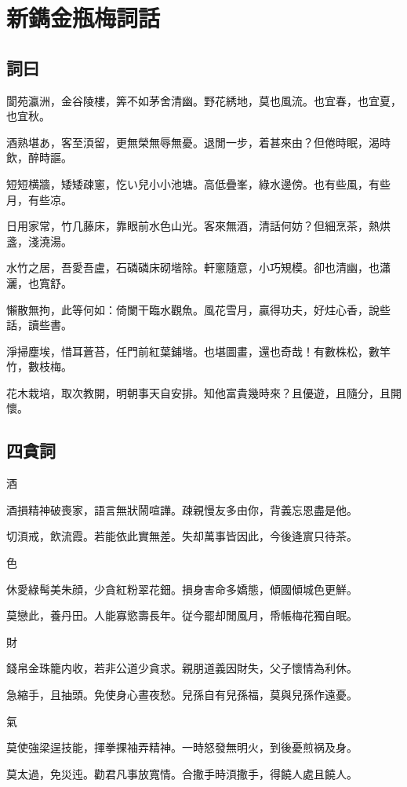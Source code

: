 \chapter*{新鐫金瓶梅詞話}


\section*{詞曰}

\begin{myquote0}
閬苑瀛洲，金谷陵樓，筭不如茅舍清幽。野花綉地，莫也風流。也宜春，也宜夏，也宜秋。

酒熟堪あ，客至湏留，更無榮無辱無憂。退閒一步，着甚來由？但倦時眠，渴時飲，醉時謳。

短短横牆，矮矮疎窻，忔い兒小小池塘。高低疊峯，綠水邊傍。也有些風，有些月，有些凉。

日用家常，竹几藤床，靠眼前水色山光。客來無酒，清話何妨？但細烹茶，熱烘盞，淺澆湯。

水竹之居，吾愛吾盧，石磷磷床砌堦除。軒窻隨意，小巧䂓模。卻也清幽，也瀟灑，也寬舒。

懶散無拘，此等何如：倚闌干臨水觀魚。風花雪月，贏得功夫，好炷心香，說些話，讀些書。

淨掃塵埃，惜耳蒼苔，任門前紅葉鋪堦。也堪圖畫，還也奇哉！有數株松，數竿竹，數枝梅。

花木栽培，取次教開，明朝事天自安排。知他富貴幾時來？且優遊，且隨分，且開懷。
\end{myquote0}

\newpage\section*{四貪詞}

\hspace*{1em}酒

\begin{myquote0}
酒損精神破喪家，語言無狀鬧喧譁。疎親慢友多由你，背義忘恩盡是他。

切湏戒，飲流霞。若能依此實無差。失却萬事皆因此，今後逄賔只待茶。
\end{myquote0}

\hspace*{1em}色

\begin{myquote0}
休愛綠髩美朱顔，少貪紅粉翠花鈿。損身害命多嬌態，傾國傾城色更鮮。

莫戀此，養丹田。人能寡慾壽長年。従今罷却閒風月，帋帳梅花獨自眠。
\end{myquote0}

\hspace*{1em}財

\begin{myquote0}
錢帛金珠籠内收，若非公道少貪求。親朋道義因財失，父子懷情為利休。

急縮手，且抽頭。免使身心晝夜愁。兒孫自有兒孫福，莫與兒孫作遠憂。
\end{myquote0}

\hspace*{1em}氣

\begin{myquote0}
莫使強梁逞技能，揮拳捰袖弄精神。一時怒發無明火，到後憂煎祸及身。

莫太過，免災迍。勸君凡事放寬情。合撒手時湏撒手，得饒人處且饒人。
\end{myquote0}


